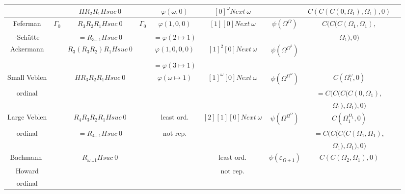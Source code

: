 \documentclass[8pt]{article}
\begin{document}
\begin{tabular}{|c|c|c|c|c|c|c|c|c|}
		&			& \(H R_2 R_1 H suc\ 0\)&			& \(\varphi(\omega,0)\)		& \([0]^\omega Next\ \omega\) &					& \(C(C(C(0,\Omega_1),\Omega_1),0)\) \\ \hline
Feferman	& \(\Gamma_0\)		& \(R_3 R_2 R_1 H suc\ 0\)
								& \(\Gamma_0\)			& \(\varphi(1,0,0)\)		& \([1] [0] Next\ \omega\)	& \(\psi(\Omega^\Omega)\)		& \(C(C(C(\Omega_1,\Omega_1),\) \\ 
-Schütte	&			& \(= R_{3 \ldots 1} H suc\ 0\) &				& \(=\varphi(2 \mapsto 1)\)	&				& 					& \(\Omega_1),0)\)		\\ \hline
Ackermann	&			& \(R_3 (R_3 R_2) R_1 H suc\ 0\) &				& \(\varphi(1,0,0,0)\)		& \([1]^2 [0] Next\ \omega\) & \(\psi(\Omega^{\Omega^2})\)		&				\\ 
		&			&			&				& \(=\varphi(3 \mapsto 1)\)	&				&					&				\\ \hline
Small Veblen	&			& \(H R_3 R_2 R_1 H suc\ 0\) &				& \(\varphi(\omega \mapsto 1)\)	& \([1]^\omega [0] Next\ \omega\) & \(\psi(\Omega^{\Omega^\omega})\)	& \(C(\Omega_1^\omega,0)\)	\\
ordinal		&			&			&				&				&				&					& \(=C(C(C(C(0,\Omega_1), \)	\\ 
		&			&			&				&				&				&					& \(\Omega_1),\Omega_1),0)\)	\\ \hline
Large Veblen	&			& \(R_4 R_3 R_2 R_1 H suc\ 0\) &				& least ord.	 	 	& \([2] [1] [0] Next\ \omega\)	& \(\psi(\Omega^{\Omega^\Omega})\)	& \(C(\Omega_1^{\Omega_1},0)\)	\\
ordinal		&			& \(= R_{4 \ldots 1} H suc\ 0\) &				& not rep.			&				&					& \(=C(C(C(C(\Omega_1,\Omega_1),\) \\ 
		&			&			&				&				&				&					& \( \Omega_1),\Omega_1),0) \)	\\ \hline
Bachmann-	&			& \(R_{\omega \ldots 1} H suc\ 0\) &				&				& least ord.			& \(\psi(\varepsilon_{\Omega+1})\)	& \(C(C(\Omega_2,\Omega_1),0)\)	\\
Howard		&			&			&				&				& not rep.			&					&				\\ 
ordinal		&			&			&				&				&				&					&				\\ \hline
  
\end{tabular}
\end{document}
